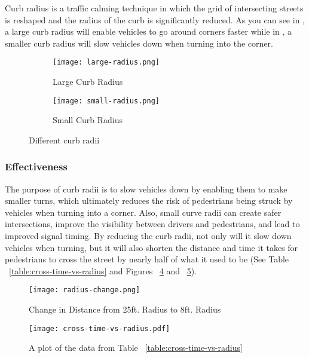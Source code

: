 Curb radius is a traffic calming technique in which the grid of intersecting streets is reshaped and the radius of the curb is significantly reduced. As you can see in , a large curb radius will enable vehicles to go around corners faster while in , a smaller curb radius will slow vehicles down when turning into the corner.

\begin{figure}[h]
\centering
\begin{subfigure}[b]{0.4\textwidth}
	\texttt{[image: large-radius.png]}
	\caption{Large Curb Radius}\label{fig:large-radius}
\end{subfigure}
\begin{subfigure}[b]{0.4\textwidth}
	\texttt{[image: small-radius.png]}
	\caption{Small Curb Radius}\label{fig:small-radius}
\end{subfigure}
\caption{Different curb radii}\label{fig:different-radii}
\end{figure}

\subsubsection{Effectiveness}

        The purpose of curb radii is to slow vehicles down by enabling them to make smaller turns, which ultimately reduces the risk of pedestrians being struck by vehicles when turning into a corner. Also, small curve radii can create safer intersections, improve the visibility between drivers and pedestrians, and lead to improved signal timing. By reducing the curb radii, not only will it slow down vehicles when turning, but it will also shorten the distance and time it takes for pedestrians to cross the street by nearly half of what it used to be (See Table ~\ref{table:cross-time-vs-radius} and Figures ~\ref{fig:radius-change} and ~\ref{fig:cross-time-vs-radius}).
        
\begin{figure}[h]
\centering
	\texttt{[image: radius-change.png]}
	\caption[Effect of changing curb radius]{Change in Distance from 25ft. Radius to 8ft. Radius}\label{fig:radius-change}
\end{figure}



\begin{figure}[h]
\centering
	\texttt{[image: cross-time-vs-radius.pdf]}
	\caption[Plot of crossing times against curve radii]{A plot of the data from Table ~\ref{table:cross-time-vs-radius}}\label{fig:cross-time-vs-radius}
\end{figure}

